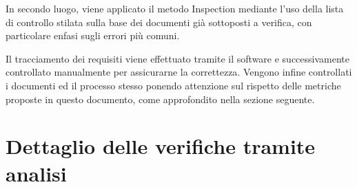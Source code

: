\documentclass[openany,12pt,a4paper]{report}
\begin{document}
In secondo luogo, viene applicato il metodo Inspection mediante l'uso della lista di controllo stilata sulla base dei documenti già sottoposti a verifica, con particolare enfasi sugli errori più comuni.

Il tracciamento dei requisiti viene effettuato tramite il software  e successivamente controllato manualmente per assicurarne la correttezza.
Vengono infine controllati i documenti ed il processo stesso ponendo attenzione sul rispetto delle metriche proposte in questo documento, come approfondito nella sezione seguente.

\section{Dettaglio delle verifiche tramite analisi}
\end{document}

